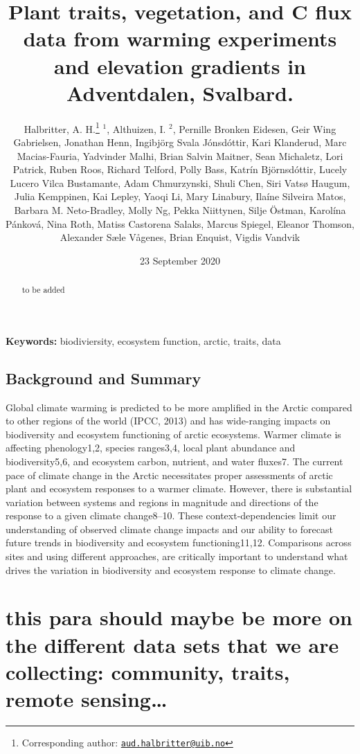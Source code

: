\documentclass[a4paper]{article}
\title{Plant traits, vegetation, and C flux data from warming experiments and elevation gradients in Adventdalen, Svalbard.}
\author{Halbritter, A. H.\footnote{Corresponding author: \href{mailto:aud.halbritter@uib.no}{\nolinkurl{aud.halbritter@uib.no}}} \(^1\), Althuizen, I. \(^2\), Pernille Bronken Eidesen, Geir Wing Gabrielsen, Jonathan Henn, Ingibjörg Svala Jónsdóttir, Kari Klanderud, Marc Macias-Fauria, Yadvinder Malhi, Brian Salvin Maitner, Sean Michaletz, Lori Patrick, Ruben Roos, Richard Telford, Polly Bass, Katrín Björnsdóttir, Lucely Lucero Vilca Bustamante, Adam Chmurzynski, Shuli Chen, Siri Vatsø Haugum, Julia Kemppinen, Kai Lepley, Yaoqi Li, Mary Linabury, Ilaíne Silveira Matos, Barbara M. Neto-Bradley, Molly Ng, Pekka Niittynen, Silje Östman, Karolína Pánková, Nina Roth, Matiss Castorena Salaks, Marcus Spiegel, Eleanor Thomson, Alexander Sæle Vågenes, Brian Enquist, Vigdis Vandvik}
\date{23 September 2020}
\begin{document}
\maketitle
\begin{abstract}
to be added
\end{abstract}

\textbf{Keywords:} biodiviersity, ecosystem function, arctic, traits, data

\hypertarget{background-and-summary}{%
\subsection{Background and Summary}\label{background-and-summary}}

Global climate warming is predicted to be more amplified in the Arctic compared to other regions of the world (IPCC, 2013) and has wide-ranging impacts on biodiversity and ecosystem functioning of arctic ecosystems.
Warmer climate is affecting phenology1,2, species ranges3,4, local plant abundance and biodiversity5,6, and ecosystem carbon, nutrient, and water fluxes7.
The current pace of climate change in the Arctic necessitates proper assessments of arctic plant and ecosystem responses to a warmer climate.
However, there is substantial variation between systems and regions in magnitude and directions of the response to a given climate change8--10.
These context-dependencies limit our understanding of observed climate change impacts and our ability to forecast future trends in biodiversity and ecosystem functioning11,12.
Comparisons across sites and using different approaches, are critically important to understand what drives the variation in biodiversity and ecosystem response to climate change.

\hypertarget{this-para-should-maybe-be-more-on-the-different-data-sets-that-we-are-collecting-community-traits-remote-sensing}{%
\section{this para should maybe be more on the different data sets that we are collecting: community, traits, remote sensing\ldots{}}\label{this-para-should-maybe-be-more-on-the-different-data-sets-that-we-are-collecting-community-traits-remote-sensing}}
\end{document}
